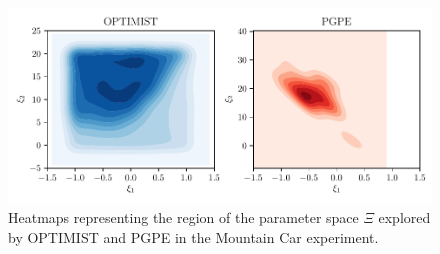 \documentclass{article}
\makeatletter
\DeclareRobustCommand{\algoname}{OPTIMIST\@\xspace}
\makeatother
\begin{document}
\begin{figure}[t]
\begin{minipage}[b]{0.24\linewidth}
    \vspace{-0.4cm}
    \caption{Cumulative average return for the Mountain Car, comparing \algoname, PGPE and PB-POIS (5 runs, 95\% c.i.)} 
    \label{fig:mc} 
  \end{minipage} %
  \hspace{0.3cm}
  \begin{minipage}[b]{0.48\linewidth}
    \centering
    \includegraphics[width=\linewidth]{plots/heat.pdf}
    \caption{Heatmaps representing the region of the parameter space $\Xi$ explored by \algoname and PGPE in the Mountain Car experiment.} 
    \label{fig:mc} 
  \end{minipage} %
  \vskip -0.2in
\end{figure}
%
 
\end{document}
